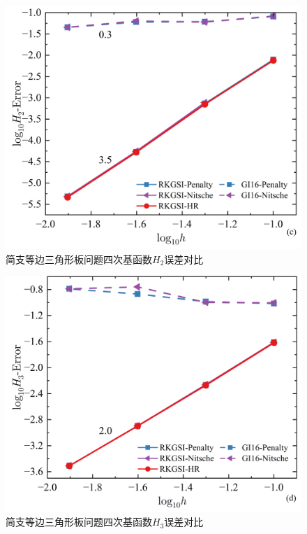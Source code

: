 \begin{figure}[H]
    \centering
    \includegraphics[scale=0.5]{figure/PHR/T/QH2.png}
    \caption{简支等边三角形板问题四次基函数$H_2$误差对比}
\end{figure}
\begin{figure}[H]
    \centering
    \includegraphics[scale=0.5]{figure/PHR/T/QH3.png}
    \caption{简支等边三角形板问题四次基函数$H_3$误差对比}\label{TQLH}
\end{figure}
\newpage
